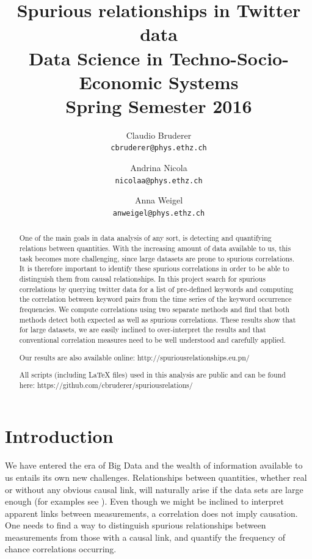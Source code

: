 \documentclass[12pt, a4paper]{article}
\author{
	Claudio Bruderer\\
	\texttt{cbruderer@phys.ethz.ch}
	\and
	Andrina Nicola\\
	\texttt{nicolaa@phys.ethz.ch}
	\and
	Anna Weigel\\
	\texttt{anweigel@phys.ethz.ch}
}
\title{Spurious relationships in Twitter data\\
	 	 \large Data Science in Techno-Socio-Economic Systems\\
	 	 \large Spring Semester 2016}
\begin{document}
\date{}
\maketitle

\begin{abstract}

One of the main goals in data analysis of any sort, is detecting and quantifying relations between quantities. With the increasing amount of data available to us, this task becomes more challenging, since large datasets are prone to spurious correlations. It is therefore important to identify these spurious correlations in order to be able to distinguish them from causal relationships. In this project search for spurious correlations by querying twitter data for a list of pre-defined keywords and computing the correlation between keyword pairs from the time series of the keyword occurrence frequencies. We compute correlations using two separate methods and find that both methods detect both expected as well as spurious correlations. These results show that for large datasets, we are easily inclined to over-interpret the results and that conventional correlation measures need to be well understood and carefully applied. 

\noindent Our results are also available online: http://spuriousrelationships.eu.pn/

\noindent All scripts (including \LaTeX$ $ files) used in this analysis are public and can be found here: https://github.com/cbruderer/spuriousrelations/

\end{abstract}


\vspace{0.2in}

\section{Introduction}
We have entered the era of Big Data and the wealth of information available to us entails its own new challenges. Relationships between quantities, whether real or without any obvious causal link, will naturally arise if the data sets are large enough (for examples see \cite{tyler_vigen}). Even though we might be inclined to interpret apparent links between measurements, a correlation does not imply causation. One needs to find a way to distinguish spurious relationships between measurements from those with a causal link, and quantify the frequency of chance correlations occurring.
\end{document}

